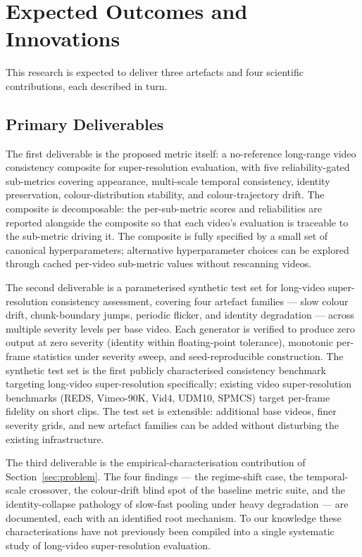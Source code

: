 \section{Expected Outcomes and Innovations}
\label{sec:outcomes}

This research is expected to deliver three artefacts and four scientific contributions, each
described in turn.

\subsection{Primary Deliverables}

The first deliverable is the proposed metric itself: a no-reference long-range video
consistency composite for super-resolution evaluation, with five reliability-gated
sub-metrics covering appearance, multi-scale temporal consistency, identity preservation,
colour-distribution stability, and colour-trajectory drift. The composite is decomposable:
the per-sub-metric scores and reliabilities are reported alongside the composite so that
each video's evaluation is traceable to the sub-metric driving it. The composite is fully
specified by a small set of canonical hyperparameters; alternative hyperparameter choices
can be explored through cached per-video sub-metric values without rescanning videos.

The second deliverable is a parameterised synthetic test set for long-video super-resolution
consistency assessment, covering four artefact families --- slow colour drift,
chunk-boundary jumps, periodic flicker, and identity degradation --- across multiple
severity levels per base video. Each generator is verified to produce zero output at zero
severity (identity within floating-point tolerance), monotonic per-frame statistics under
severity sweep, and seed-reproducible construction. The synthetic test set is the first
publicly characterised consistency benchmark targeting long-video super-resolution
specifically; existing video super-resolution benchmarks (REDS, Vimeo-90K, Vid4, UDM10,
SPMCS) target per-frame fidelity on short clips. The test set is extensible: additional
base videos, finer severity grids, and new artefact families can be added without
disturbing the existing infrastructure.

The third deliverable is the empirical-characterisation contribution of
Section~\ref{sec:problem}. The four findings --- the regime-shift case, the temporal-scale
crossover, the colour-drift blind spot of the baseline metric suite, and the
identity-collapse pathology of slow-fast pooling under heavy degradation --- are
documented, each with an identified root mechanism. To our knowledge these characterisations
have not previously been compiled into a single systematic study of long-video
super-resolution evaluation.

